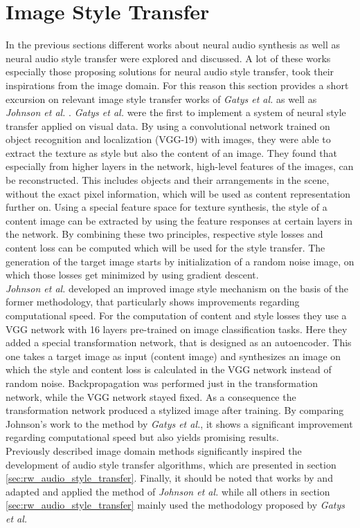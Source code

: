 \section{Image Style Transfer}
\label{sec:rw_imgstyletransfer}
In the previous sections different works about neural audio synthesis as well as neural audio style transfer were explored and discussed. A lot of these works especially those proposing solutions for neural audio style transfer, took their inspirations from the image domain. For this reason this section provides a short excursion on relevant image style transfer works of \textit{Gatys et al.} as well as \textit{Johnson et al.} \cite{Gatys2016, johnson2016perceptual}. \textit{Gatys et al.} were the first to implement a system of neural style transfer applied on visual data. By using a convolutional network trained on object recognition and localization (VGG-19) with images, they were able to extract the texture as style but also the content of an image. They found that especially from higher layers in the network, high-level features of the images, can be reconstructed. This includes objects and their arrangements in the scene, without the exact pixel information, which will be used as content representation further on. Using a special feature space for texture synthesis, the style of a content image can be extracted by using the feature responses at certain layers in the network. By combining these two principles, respective style losses and content loss can be computed which will be used for the style transfer. The generation of the target image starts by initialization of a random noise image, on which those losses get minimized by using gradient descent.\\
\textit{Johnson et al.} developed an improved image style mechanism on the basis of the former methodology, that particularly shows improvements regarding computational speed. For the computation of content and style losses they use a VGG network with 16 layers pre-trained on image classification tasks. Here they added a special transformation network, that is designed as an autoencoder. This one takes a target image as input (content image) and synthesizes an image on which the style and content loss is calculated in the VGG network instead of random noise. Backpropagation was performed just in the transformation network, while the VGG network stayed fixed. As a consequence the transformation network produced a stylized image after training. By comparing Johnson's work to the method by \textit{Gatys et al.}, it shows a significant improvement regarding computational speed but also yields promising results.\\
Previously described image domain methods significantly inspired the development of audio style transfer algorithms, which are presented in section \ref{sec:rw_audio_style_transfer}. Finally, it should be noted that works by \cite{Ramani2018} and \cite{Liu2019} adapted and applied the method of \textit{Johnson et al.} while all others in section \ref{sec:rw_audio_style_transfer} mainly used the methodology proposed by \textit{Gatys et al.}